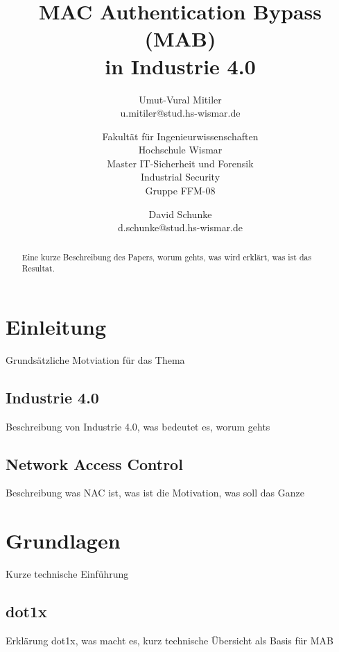 \documentclass[conference]{IEEEtran}
\begin{document}
\title{MAC Authentication Bypass (MAB)\\ in Industrie 4.0}
\author{
	Umut-Vural Mitiler\\
	u.mitiler@stud.hs-wismar.de
	\and
	Fakultät für Ingenieurwissenschaften\\
	Hochschule Wismar\\
	Master IT-Sicherheit und Forensik\\
	Industrial Security\\
	Gruppe FFM-08
	\and
	David Schunke\\
	d.schunke@stud.hs-wismar.de
}

\maketitle

\thispagestyle{plain}
\pagestyle{plain}

%

\begin{abstract}
Eine kurze Beschreibung des Papers, worum gehts, was wird erklärt, was ist das Resultat.
\end{abstract}

%

\section{Einleitung}
Grundsätzliche Motviation für das Thema

\subsection{Industrie 4.0}
Beschreibung von Industrie 4.0, was bedeutet es, worum gehts

\subsection{Network Access Control}
Beschreibung was NAC ist, was ist die Motivation, was soll das Ganze

%

\section{Grundlagen}
Kurze technische Einführung

\subsection{dot1x}
Erklärung dot1x, was macht es, kurz technische Übersicht als Basis für MAB
\end{document}
